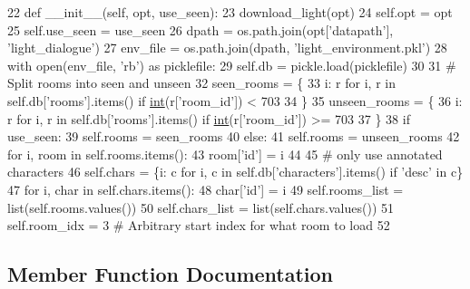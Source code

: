 \begin{DoxyCode}
22     \textcolor{keyword}{def }\_\_init\_\_(self, opt, use\_seen):
23         download\_light(opt)
24         self.opt = opt
25         self.use\_seen = use\_seen
26         dpath = os.path.join(opt[\textcolor{stringliteral}{'datapath'}], \textcolor{stringliteral}{'light\_dialogue'})
27         env\_file = os.path.join(dpath, \textcolor{stringliteral}{'light\_environment.pkl'})
28         with open(env\_file, \textcolor{stringliteral}{'rb'}) \textcolor{keyword}{as} picklefile:
29             self.db = pickle.load(picklefile)
30 
31         \textcolor{comment}{# Split rooms into seen and unseen}
32         seen\_rooms = \{
33             i: r \textcolor{keywordflow}{for} i, r \textcolor{keywordflow}{in} self.db[\textcolor{stringliteral}{'rooms'}].items() \textcolor{keywordflow}{if} \hyperlink{namespaceprojects_1_1mastering__the__dungeon_1_1mturk_1_1tasks_1_1MTD_1_1run_a693eb03afbb820bbfe8b47b12e69e519}{int}(r[\textcolor{stringliteral}{'room\_id'}]) < 703
34         \}
35         unseen\_rooms = \{
36             i: r \textcolor{keywordflow}{for} i, r \textcolor{keywordflow}{in} self.db[\textcolor{stringliteral}{'rooms'}].items() \textcolor{keywordflow}{if} \hyperlink{namespaceprojects_1_1mastering__the__dungeon_1_1mturk_1_1tasks_1_1MTD_1_1run_a693eb03afbb820bbfe8b47b12e69e519}{int}(r[\textcolor{stringliteral}{'room\_id'}]) >= 703
37         \}
38         \textcolor{keywordflow}{if} use\_seen:
39             self.rooms = seen\_rooms
40         \textcolor{keywordflow}{else}:
41             self.rooms = unseen\_rooms
42         \textcolor{keywordflow}{for} i, room \textcolor{keywordflow}{in} self.rooms.items():
43             room[\textcolor{stringliteral}{'id'}] = i
44 
45         \textcolor{comment}{# only use annotated characters}
46         self.chars = \{i: c \textcolor{keywordflow}{for} i, c \textcolor{keywordflow}{in} self.db[\textcolor{stringliteral}{'characters'}].items() \textcolor{keywordflow}{if} \textcolor{stringliteral}{'desc'} \textcolor{keywordflow}{in} c\}
47         \textcolor{keywordflow}{for} i, char \textcolor{keywordflow}{in} self.chars.items():
48             char[\textcolor{stringliteral}{'id'}] = i
49         self.rooms\_list = list(self.rooms.values())
50         self.chars\_list = list(self.chars.values())
51         self.room\_idx = 3  \textcolor{comment}{# Arbitrary start index for what room to load}
52 
\end{DoxyCode}


\subsection{Member Function Documentation}
\mbox{\label{classlight__chats_1_1run_1_1GraphGenerator_aa59d2f6eb662add984d10f89d25ccab4}} 

